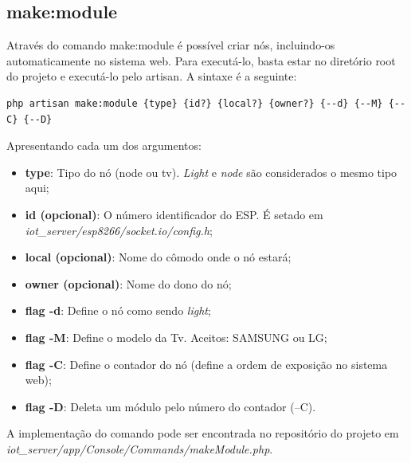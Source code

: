 \documentclass[
12pt,				%
openany,			%
twoside,			%
a4paper,			%
english,			%
french,				%
spanish,			%
brazil,				%
]{abntex2}
\begin{document}
\subsection{make:module}
Através do comando \textsf{make:module} é possível criar nós, incluindo-os automaticamente no sistema web. Para executá-lo, basta estar no diretório root do projeto e executá-lo pelo artisan. A sintaxe é a seguinte:

\begin{lstlisting}[style=bash,caption={Executando comando \textsf{make:module}}]
    php artisan make:module {type} {id?} {local?} {owner?} {--d} {--M} {--C} {--D}
\end{lstlisting}

Apresentando cada um dos argumentos:

\begin{itemize}
    \item \textbf{type}: Tipo do nó (node ou tv). \textit{Light} e \textit{node} são considerados o mesmo tipo aqui;
    \item \textbf{id (opcional)}: O número identificador do ESP. É setado em \textit{iot\_server/esp8266/socket.io/config.h};
    \item \textbf{local (opcional)}: Nome do cômodo onde o nó estará;
    \item \textbf{owner (opcional)}: Nome do dono do nó;
    \item \textbf{flag -\-d}: Define o nó como sendo \textit{light};
    \item \textbf{flag -\-M}: Define o modelo da Tv. Aceitos: SAMSUNG ou LG;
    \item \textbf{flag -\-C}: Define o contador do nó (define a ordem de exposição no sistema web);
    \item \textbf{flag -\-D}: Deleta um módulo pelo número do contador (--C).
\end{itemize}

A implementação do comando pode ser encontrada no repositório do projeto em \textit{iot\_server/app/Console/Commands/makeModule.php}.


\end{document}
